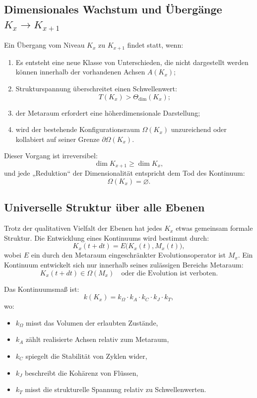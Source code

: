 \subsection{Dimensionales Wachstum und Übergänge $K_x \to K_{x+1}$}

Ein Übergang vom Niveau $K_x$ zu $K_{x+1}$ findet statt, wenn:
\begin{enumerate}
    \item Es entsteht eine neue Klasse von Unterschieden, die nicht dargestellt werden können
          innerhalb der vorhandenen Achsen $A(K_x)$;
    \item Strukturspannung überschreitet einen Schwellenwert:
    \[
        T(K_x) > \Theta_{\mathrm{dim}}(K_x);
    \]
    \item der Metaraum erfordert eine höherdimensionale Darstellung;
    \item wird der bestehende Konfigurationsraum $\Omega(K_x)$
          unzureichend oder kollabiert auf seiner Grenze $\partial\Omega(K_x)$.
\end{enumerate}

Dieser Vorgang ist irreversibel:
\[
\dim K_{x+1} \ge \dim K_x,
\]
und jede „Reduktion“ der Dimensionalität entspricht dem Tod des
Kontinuum:
\[
\Omega(K_x) = \varnothing.
\]


\subsection{Universelle Struktur über alle Ebenen}

Trotz der qualitativen Vielfalt der Ebenen hat jedes $K_x$ etwas gemeinsam
formale Struktur.
Die Entwicklung eines Kontinuums wird bestimmt durch:
\[
K_x(t + dt) = E\bigl(K_x(t), M_x(t)\bigr),
\]
wobei $E$ ein durch den Metaraum eingeschränkter Evolutionsoperator ist
$M_x$.
Ein Kontinuum entwickelt sich nur innerhalb seines zulässigen Bereichs
Metaraum:
\[
K_x(t+dt) \in \Omega(M_x)
\quad\text{oder die Evolution ist verboten}.
\]

Das Kontinuumsmaß ist:
\[
k(K_x) =
k_{\Omega} \cdot k_{A} \cdot k_{C} \cdot k_{J} \cdot k_{T},
\]
wo:
\begin{itemize}
    \item $k_{\Omega}$ misst das Volumen der erlaubten Zustände,
    \item $k_{A}$ zählt realisierte Achsen relativ zum Metaraum,
    \item $k_{C}$ spiegelt die Stabilität von Zyklen wider,
    \item $k_{J}$ beschreibt die Kohärenz von Flüssen,
    \item $k_{T}$ misst die strukturelle Spannung relativ zu Schwellenwerten.
\end{itemize}


